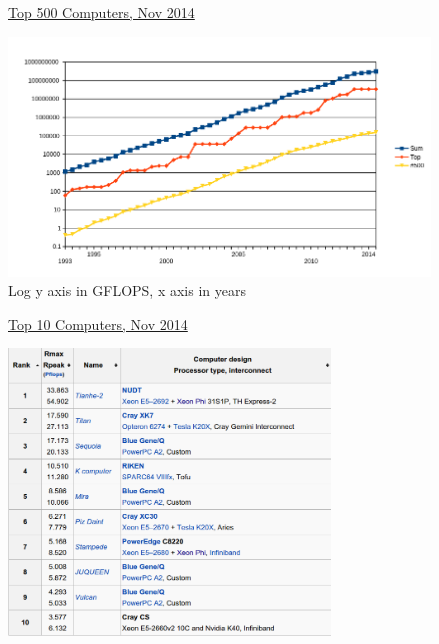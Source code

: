 \documentclass[xcolor=x11names,compress]{beamer}
\renewcommand{\(}{\begin{columns}}
\renewcommand{\)}{\end{columns}}
\newcommand{\<}[1]{\begin{column}{#1}}
\renewcommand{\>}{\end{column}}
\begin{document}
\begin{frame}{\href{http://www.top500.org/list/2014/11/}{Top 500 Computers, Nov 2014}}

\begin{center}
\includegraphics[height=2.5in]{Supercomputers-history}\\
Log y axis in GFLOPS, x axis in years
\end{center}

\end{frame}

\begin{frame}{\href{http://en.wikipedia.org/wiki/TOP500}{Top 10 Computers, Nov 2014}}

\begin{center}
\includegraphics[height=3in]{2014-top-10}
\end{center}


\end{frame}
\end{document}
